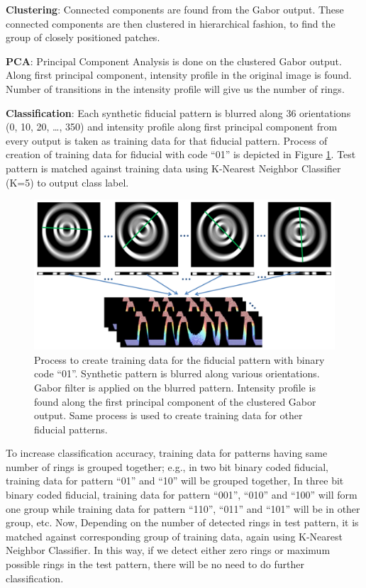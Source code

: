 \documentclass[runningheads]{llncs}
\begin{document}
\noindent\textbf{Clustering}: Connected components are found from the Gabor
output.
These connected components are then clustered in hierarchical fashion, to find
the group of closely positioned patches.

\noindent\textbf{PCA}: Principal Component Analysis is done on the clustered
Gabor output. Along first principal component, intensity profile in the original image
is found. Number of transitions in the intensity profile will give us the
number of rings.

\noindent\textbf{Classification}: Each synthetic fiducial pattern is blurred
along 36 orientations (0, 10, 20, \ldots , 350) and intensity profile along first
principal component from every output is taken as training data for that
fiducial pattern. Process of creation of training data for fiducial with
code ``01'' is depicted in Figure \ref{fig:training_data}. Test pattern is matched
against training data using K-Nearest Neighbor Classifier (K=5) to output class label.

\begin{figure}[h!]
\centering
  \includegraphics[width=\linewidth]{training_data.pdf}
  \caption{Process to create training data for the fiducial pattern with binary
  code ``01''. Synthetic pattern is blurred along various orientations. Gabor
  filter is applied on the blurred pattern. Intensity profile is found along the
  first principal component of the clustered Gabor output. Same process is used
  to create training data for other fiducial patterns.}
  \label{fig:training_data}
\end{figure}

To increase classification accuracy, training data for patterns having same
number of rings is grouped together; e.g., in two bit binary coded fiducial,
training data for pattern ``01'' and ``10'' will be grouped together, In three
bit binary coded fiducial, training data for pattern “001”, “010” and “100” will
form one group while training data for pattern “110”, “011” and “101” will be
in other group, etc. Now, Depending on the number of detected rings in test
pattern, it is matched against corresponding group of training data, again
using  K-Nearest Neighbor Classifier. In this way, if we detect either zero
rings or maximum possible rings in the test pattern, there will be no need to do
further classification.
\end{document}
